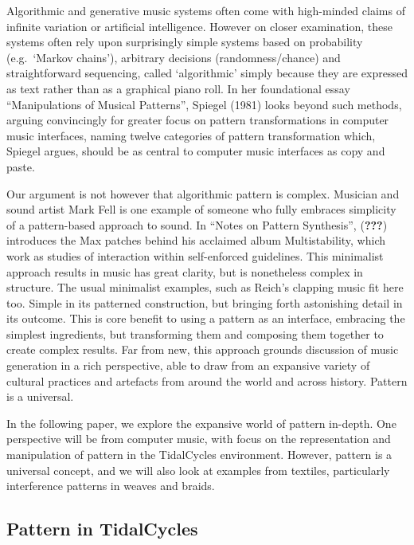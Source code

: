 \documentclass[
]{article}
\begin{document}
Algorithmic and generative music systems often come with high-minded
claims of infinite variation or artificial intelligence. However on
closer examination, these systems often rely upon surprisingly simple
systems based on probability (e.g.~`Markov chains'), arbitrary decisions
(randomness/chance) and straightforward sequencing, called `algorithmic'
simply because they are expressed as text rather than as a graphical
piano roll. In her foundational essay ``Manipulations of Musical
Patterns'', Spiegel (1981) looks beyond such methods, arguing
convincingly for greater focus on pattern transformations in computer
music interfaces, naming twelve categories of pattern transformation
which, Spiegel argues, should be as central to computer music interfaces
as copy and paste.

Our argument is not however that algorithmic pattern is complex.
Musician and sound artist Mark Fell is one example of someone who fully
embraces simplicity of a pattern-based approach to sound. In ``Notes on
Pattern Synthesis'', ({\textbf{???}}) introduces the Max patches behind
his acclaimed album Multistability, which work as studies of interaction
within self-enforced guidelines. This minimalist approach results in
music has great clarity, but is nonetheless complex in structure. The
usual minimalist examples, such as Reich's clapping music fit here too.
Simple in its patterned construction, but bringing forth astonishing
detail in its outcome. This is core benefit to using a pattern as an
interface, embracing the simplest ingredients, but transforming them and
composing them together to create complex results. Far from new, this
approach grounds discussion of music generation in a rich perspective,
able to draw from an expansive variety of cultural practices and
artefacts from around the world and across history. Pattern is a
universal.

In the following paper, we explore the expansive world of pattern
in-depth. One perspective will be from computer music, with focus on the
representation and manipulation of pattern in the TidalCycles
environment. However, pattern is a universal concept, and we will also
look at examples from textiles, particularly interference patterns in
weaves and braids.

\hypertarget{pattern-in-tidalcycles}{%
\subsection{Pattern in TidalCycles}\label{pattern-in-tidalcycles}}
\end{document}
